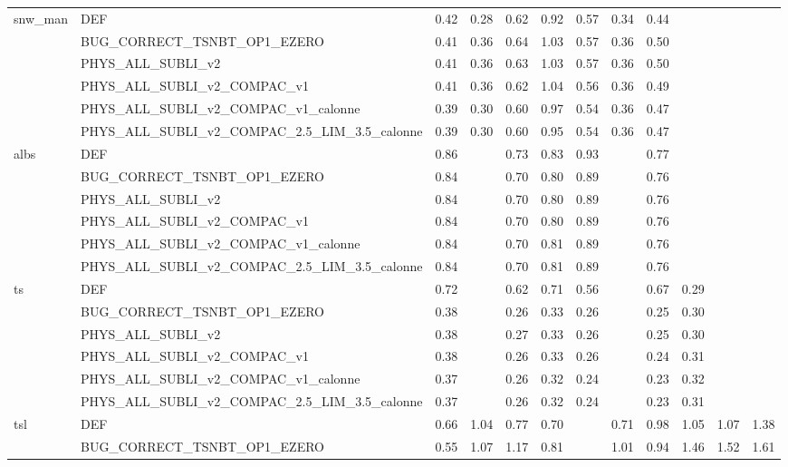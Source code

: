 \begin{tabular}{llllllllllll}
\cline{1-12}
\multirow[t]{6}{*}{snw_man} & DEF & 0.42 & 0.28 & 0.62 & 0.92 & 0.57 & 0.34 & 0.44 &  &  &  \\
 & BUG_CORRECT_TSNBT_OP1_EZERO & 0.41 & 0.36 & 0.64 & 1.03 & 0.57 & 0.36 & 0.50 &  &  &  \\
 & PHYS_ALL_SUBLI_v2 & 0.41 & 0.36 & 0.63 & 1.03 & 0.57 & 0.36 & 0.50 &  &  &  \\
 & PHYS_ALL_SUBLI_v2_COMPAC_v1 & 0.41 & 0.36 & 0.62 & 1.04 & 0.56 & 0.36 & 0.49 &  &  &  \\
 & PHYS_ALL_SUBLI_v2_COMPAC_v1_calonne & 0.39 & 0.30 & 0.60 & 0.97 & 0.54 & 0.36 & 0.47 &  &  &  \\
 & PHYS_ALL_SUBLI_v2_COMPAC_2.5_LIM_3.5_calonne & 0.39 & 0.30 & 0.60 & 0.95 & 0.54 & 0.36 & 0.47 &  &  &  \\
\cline{1-12}
\multirow[t]{6}{*}{albs} & DEF & 0.86 &  & 0.73 & 0.83 & 0.93 &  & 0.77 &  &  &  \\
 & BUG_CORRECT_TSNBT_OP1_EZERO & 0.84 &  & 0.70 & 0.80 & 0.89 &  & 0.76 &  &  &  \\
 & PHYS_ALL_SUBLI_v2 & 0.84 &  & 0.70 & 0.80 & 0.89 &  & 0.76 &  &  &  \\
 & PHYS_ALL_SUBLI_v2_COMPAC_v1 & 0.84 &  & 0.70 & 0.80 & 0.89 &  & 0.76 &  &  &  \\
 & PHYS_ALL_SUBLI_v2_COMPAC_v1_calonne & 0.84 &  & 0.70 & 0.81 & 0.89 &  & 0.76 &  &  &  \\
 & PHYS_ALL_SUBLI_v2_COMPAC_2.5_LIM_3.5_calonne & 0.84 &  & 0.70 & 0.81 & 0.89 &  & 0.76 &  &  &  \\
\cline{1-12}
\multirow[t]{6}{*}{ts} & DEF & 0.72 &  & 0.62 & 0.71 & 0.56 &  & 0.67 & 0.29 &  &  \\
 & BUG_CORRECT_TSNBT_OP1_EZERO & 0.38 &  & 0.26 & 0.33 & 0.26 &  & 0.25 & 0.30 &  &  \\
 & PHYS_ALL_SUBLI_v2 & 0.38 &  & 0.27 & 0.33 & 0.26 &  & 0.25 & 0.30 &  &  \\
 & PHYS_ALL_SUBLI_v2_COMPAC_v1 & 0.38 &  & 0.26 & 0.33 & 0.26 &  & 0.24 & 0.31 &  &  \\
 & PHYS_ALL_SUBLI_v2_COMPAC_v1_calonne & 0.37 &  & 0.26 & 0.32 & 0.24 &  & 0.23 & 0.32 &  &  \\
 & PHYS_ALL_SUBLI_v2_COMPAC_2.5_LIM_3.5_calonne & 0.37 &  & 0.26 & 0.32 & 0.24 &  & 0.23 & 0.31 &  &  \\
\cline{1-12}
\multirow[t]{6}{*}{tsl} & DEF & 0.66 & 1.04 & 0.77 & 0.70 &  & 0.71 & 0.98 & 1.05 & 1.07 & 1.38 \\
 & BUG_CORRECT_TSNBT_OP1_EZERO & 0.55 & 1.07 & 1.17 & 0.81 &  & 1.01 & 0.94 & 1.46 & 1.52 & 1.61 \\

\end{tabular}
